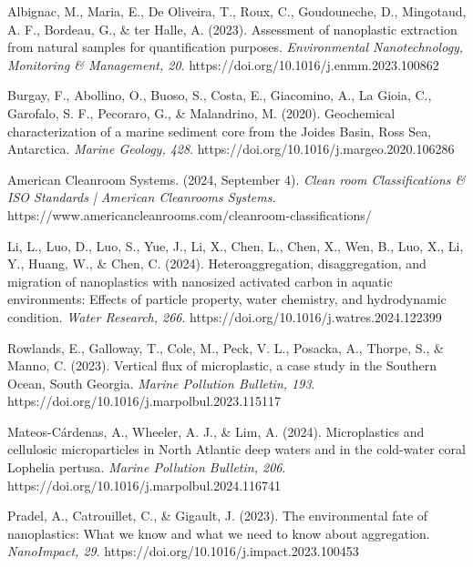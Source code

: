\documentclass[twocolumn,a4paper,aps,amsmath,amssymb,floatfix,superscriptaddress]{revtex4-2}
\begin{document}
	
	\begin{thebibliography}{99}		
		Albignac, M., Maria, E., De Oliveira, T., Roux, C., Goudouneche, D., Mingotaud, A. F., Bordeau, G., \& ter Halle, A. (2023). Assessment of nanoplastic extraction from natural samples for quantification purposes. \textit{Environmental Nanotechnology, Monitoring \& Management, 20}. https://doi.org/10.1016/j.enmm.2023.100862
		
		Burgay, F., Abollino, O., Buoso, S., Costa, E., Giacomino, A., La Gioia, C., Garofalo, S. F., Pecoraro, G., \& Malandrino, M. (2020). Geochemical characterization of a marine sediment core from the Joides Basin, Ross Sea, Antarctica. \textit{Marine Geology, 428}. https://doi.org/10.1016/j.margeo.2020.106286 
				
		American Cleanroom Systems. (2024, September 4). \textit{Clean room Classifications \& ISO Standards | American Cleanrooms Systems.} https://www.americancleanrooms.com/cleanroom-classifications/
		
		Li, L., Luo, D., Luo, S., Yue, J., Li, X., Chen, L., Chen, X., Wen, B., Luo, X., Li, Y., Huang, W., \& Chen, C. (2024). Heteroaggregation, disaggregation, and migration of nanoplastics with nanosized activated carbon in aquatic environments: Effects of particle property, water chemistry, and hydrodynamic condition. \textit{Water Research, 266}. https://doi.org/10.1016/j.watres.2024.122399
		
		Rowlands, E., Galloway, T., Cole, M., Peck, V. L., Posacka, A., Thorpe, S., \& Manno, C. (2023). Vertical flux of microplastic, a case study in the Southern Ocean, South Georgia. \textit{Marine Pollution Bulletin, 193}. https://doi.org/10.1016/j.marpolbul.2023.115117
		
		Mateos-Cárdenas, A., Wheeler, A. J., \& Lim, A. (2024). Microplastics and cellulosic microparticles in North Atlantic deep waters and in the cold-water coral Lophelia pertusa. \textit{Marine Pollution Bulletin, 206}. https://doi.org/10.1016/j.marpolbul.2024.116741
		
		Pradel, A., Catrouillet, C., \& Gigault, J. (2023). The environmental fate of nanoplastics: What we know and what we need to know about aggregation. \textit{NanoImpact, 29}. https://doi.org/10.1016/j.impact.2023.100453
		

\end{thebibliography}
\end{document}

